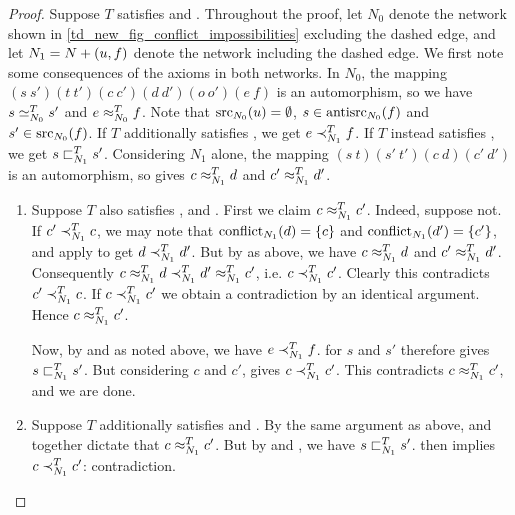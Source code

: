 \begin{proof}
    Suppose $T$ satisfies \symmetry{} and \claimcoherence{}.
    Throughout the proof, let $N_0$ denote the network shown in
    \cref{td_new_fig_conflict_impossibilities} excluding the dashed edge, and
    let $N_1 = {N} + ({u}, {f})$ denote the network including the dashed
    edge. We first note some consequences of the axioms in both networks. In
    $N_0$, the mapping $(s\ s')(t\ t')(c\ c')(d\ d')(o\ o')(e\ f)$ is an
    automorphism, so we have $s \simeq_{N_0}^T s'$ and $e \approx_{N_0}^T f$. Note
    that $\operatorname{src}_{N_0}(u) = \emptyset$, $s \in \operatorname{antisrc}_{N_0}(f)$ and $s' \in
    \operatorname{src}_{N_0}(f)$. If $T$ additionally satisfies \freshposresp{}, we get $e
    \prec_{N_1}^T f$. If $T$ instead satisfies \sourceposresp{}, we get $s
    \sqsubset_{N_1}^T s'$.
    Considering $N_1$ alone, the mapping $(s\ t)(s'\ t')(c\ d)(c'\ d')$ is an
    automorphism, so \symmetry{} gives $c \approx_{N_1}^T d$ and $c' \approx_{N_1}^T
    d'$.

    \begin{enumerate}

        \item Suppose $T$ also satisfies \freshposresp{}, \sourcecoherence{}
              and \conflictcoherence{}. First we claim $c \approx_{N_1}^T c'$.
              Indeed, suppose not. If $c' \prec_{N_1}^T c$, we may note that
              $\operatorname{conflict}_{N_1}(d) = \{c\}$ and $\operatorname{conflict}_{N_1}(d') = \{c'\}$,
              and apply \conflictcoherence{} to get $d \prec_{N_1}^T d'$. But by
              \symmetry{} as above, we have $c \approx_{N_1}^T d$ and $c'
              \approx_{N_1}^T d'$. Consequently $c \approx_{N_1}^T d \prec_{N_1}^T d'
              \approx_{N_1}^T c'$, i.e. $c \prec_{N_1}^T c'$. Clearly this
              contradicts $c' \prec_{N_1}^T c$. If $c \prec_{N_1}^T c'$ we obtain
              a contradiction by an identical argument. Hence $c \approx_{N_1}^T
              c'$.

              Now, by \freshposresp{} and \symmetry{} as noted above, we have
              $e \prec_{N_1}^T f$. \sourcecoherence{} for $s$ and $s'$ therefore
              gives $s \sqsubset_{N_1}^T s'$. But considering $c$ and $c'$,
              \claimcoherence{} gives $c \prec_{N_1}^T c'$. This contradicts $c
              \approx_{N_1}^T c'$, and we are done.

        \item Suppose $T$ additionally satisfies \sourceposresp{} and
              \conflictcoherence{}. By the same argument as above,
              \conflictcoherence{} and \symmetry{} together dictate that $c
              \approx_{N_1}^T c'$. But by \symmetry{} and \sourceposresp{}, we
              have $s \sqsubset_{N_1}^T s'$. \claimcoherence{} then implies $c
              \prec_{N_1}^T c'$: contradiction.


\end{enumerate}
\end{proof}
